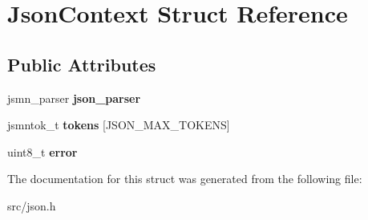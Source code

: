 \hypertarget{struct_json_context}{}\section{Json\+Context Struct Reference}
\label{struct_json_context}
\subsection*{Public Attributes}
\begin{DoxyCompactItemize}
\item 
\hypertarget{struct_json_context_a853ea9b1453bf73ee93a2a13e177d99b}{}jsmn\+\_\+parser {\bfseries json\+\_\+parser}\label{struct_json_context_a853ea9b1453bf73ee93a2a13e177d99b}

\item 
\hypertarget{struct_json_context_a4f910b7497f62e2305b58f95de7bfcff}{}jsmntok\+\_\+t {\bfseries tokens} \mbox{[}J\+S\+O\+N\+\_\+\+M\+A\+X\+\_\+\+T\+O\+K\+E\+N\+S\mbox{]}\label{struct_json_context_a4f910b7497f62e2305b58f95de7bfcff}

\item 
\hypertarget{struct_json_context_acbdbc252b6ff7f56a0ac04dc442f9831}{}uint8\+\_\+t {\bfseries error}\label{struct_json_context_acbdbc252b6ff7f56a0ac04dc442f9831}

\end{DoxyCompactItemize}


The documentation for this struct was generated from the following file\+:\begin{DoxyCompactItemize}
\item 
src/json.\+h\end{DoxyCompactItemize}
